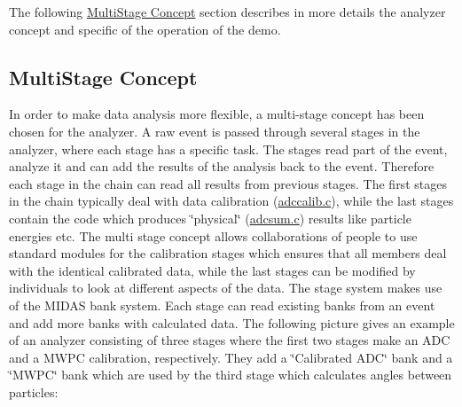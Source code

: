 The following \hyperlink{DataAnalysis_DA_Multi_Stage_Concept}{MultiStage Concept} section describes in more details the analyzer concept and specific of the operation of the demo.

\label{DataAnalysis_idx_analyzer_multi-stage-concept}
\hypertarget{DataAnalysis_idx_analyzer_multi-stage-concept}{}
 

 \hypertarget{DataAnalysis_DA_Multi_Stage_Concept}{}\subsection{MultiStage Concept}\label{DataAnalysis_DA_Multi_Stage_Concept}
In order to make data analysis more flexible, a multi-\/stage concept has been chosen for the analyzer. A raw event is passed through several stages in the analyzer, where each stage has a specific task. The stages read part of the event, analyze it and can add the results of the analysis back to the event. Therefore each stage in the chain can read all results from previous stages. The first stages in the chain typically deal with data calibration (\hyperlink{adccalib_8c}{adccalib.c}), while the last stages contain the code which produces \char`\"{}physical\char`\"{} (\hyperlink{adcsum_8c}{adcsum.c}) results like particle energies etc. The multi stage concept allows collaborations of people to use standard modules for the calibration stages which ensures that all members deal with the identical calibrated data, while the last stages can be modified by individuals to look at different aspects of the data. The stage system makes use of the MIDAS bank system. Each stage can read existing banks from an event and add more banks with calculated data. The following picture gives an example of an analyzer consisting of three stages where the first two stages make an ADC and a MWPC calibration, respectively. They add a \char`\"{}Calibrated ADC\char`\"{} bank and a \char`\"{}MWPC\char`\"{} bank which are used by the third stage which calculates angles between particles:

\begin{center}  \end{center} 

